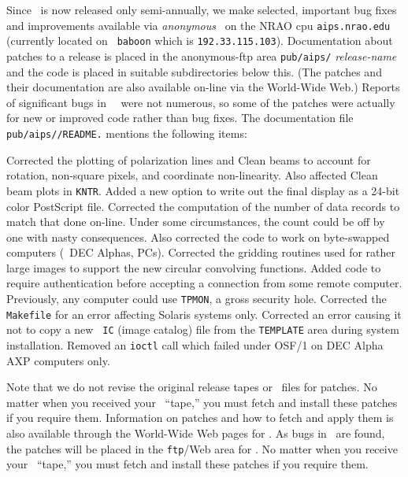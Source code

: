 Since \AIPS\ is now released only semi-annually, we make selected,
important bug fixes and improvements available via {\it anonymous}
\ftp\ on the NRAO cpu {\tt aips.nrao.edu} (currently located on {\tt
baboon} which is {\tt 192.33.115.103}).  Documentation about patches
to a release is placed in the anonymous-ftp area {\tt pub/aips/}{\it
release-name} and the code is placed in suitable subdirectories below
this.  (The patches and their documentation are also available on-line
via the World-Wide Web.)  Reports of significant bugs in \OLDNAME\
\AIPS\ were not numerous, so some of the patches were actually for new
or improved code rather than bug fixes.  The documentation file {\tt
pub/aips/\OLDNAME/README.\OLDNAME} mentions the following items:
\begin{description}
\vspace{-8pt}
 Corrected the plotting of polarization lines and Clean
   beams to account for rotation, non-square pixels, and coordinate
   non-linearity.  Also affected Clean beam plots in \hbox{{\tt KNTR}}.
\myitem{TVRGB} Added a new option to write out the final display as a
   24-bit color PostScript file.
 Corrected the computation of the number of data records
   to match that done on-line.  Under some circumstances, the count
   could be off by one with nasty consequences.  Also corrected the
   code to work on byte-swapped computers (\eg\ DEC Alphas, PCs).
\myitem{SDGRD} Corrected the gridding routines used for rather large
   images to support the new circular convolving functions.
 Added code to require authentication before accepting a
   connection from some remote computer.  Previously, any computer
   could use {\tt TPMON}, a gross security hole.
 Corrected the {\tt Makefile} for an error affecting
   Solaris systems only.
 Corrected an error causing it not to copy a new {\tt
   IC} (image catalog) file from the {\tt TEMPLATE} area during system
   installation.
 Removed an {\tt ioctl} call which failed under OSF/1
   on DEC Alpha AXP computers only.
\end{description}
\vspace{-8pt}
Note that we do not revise the original release tapes or \tar\ files
for patches.  No matter when you received your \OLDNAME\ ``tape,'' you
must fetch and install these patches if you require them.  Information
on patches and how to fetch and apply them is also available through
the World-Wide Web pages for \hbox{\AIPS}.  As bugs in \RELEASENAME\
are found, the patches will be placed in the {\tt ftp}/Web area for
\hbox{{\RELEASENAME}}.  No matter when you receive your \RELEASENAME\
``tape,'' you must fetch and install these patches if you require
them.

